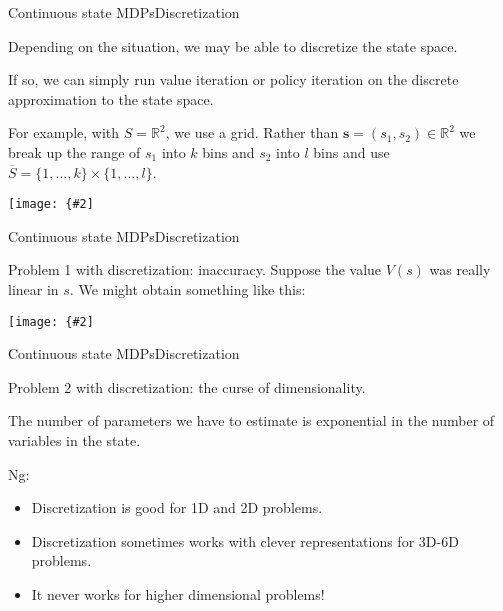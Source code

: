 \documentclass{beamer}
\renewcommand{\vec}[1]{\boldsymbol{#1}}
\def\Rset{\mathbb{R}}
\newcommand{\myfig}[3]{\centerline{\texttt{[image: \{\#2]}}}
    \centerline{\scriptsize #3}}
\begin{document}
\begin{frame}{Continuous state MDPs}{Discretization}

  Depending on the situation, we may be able to \alert{discretize} the state space.

  \medskip

  If so, we can simply run value iteration or policy iteration on the
  discrete approximation to the state space.

  \medskip

  For example, with $S=\Rset^2$, we use a \alert{grid}. Rather than $\vec{s} = (s_1,s_2) \in \Rset^2$ we break up the range of $s_1$ into $k$ bins and $s_2$ into $l$ bins and use $\overline{S} = \{1,...,k\}\times \{1,...,l\}$.

  \medskip

  \myfig{1.5in}{ng-discrete}{Ng (2017), CS 229 lecture notes, set 12}
  
\end{frame}


\begin{frame}{Continuous state MDPs}{Discretization}

  Problem 1 with discretization: \alert{inaccuracy}. Suppose the value
  $V(s)$ was really linear in $s$. We might obtain something like this:

  \myfig{2.5in}{ng-approx}{Ng (2017), CS 229 lecture notes, set 12}

\end{frame}


\begin{frame}{Continuous state MDPs}{Discretization}

  Problem 2 with discretization: \alert{the curse of dimensionality}.

  \medskip

  The number of parameters we have to estimate is exponential in the number
  of variables in the state.

  \medskip

  Ng:
  \begin{itemize}
  \item Discretization is good for 1D and 2D problems.
  \item Discretization sometimes works with clever representations for 3D-6D problems.
  \item It never works for higher dimensional problems!
  \end{itemize}
  
\end{frame}
\end{document}
